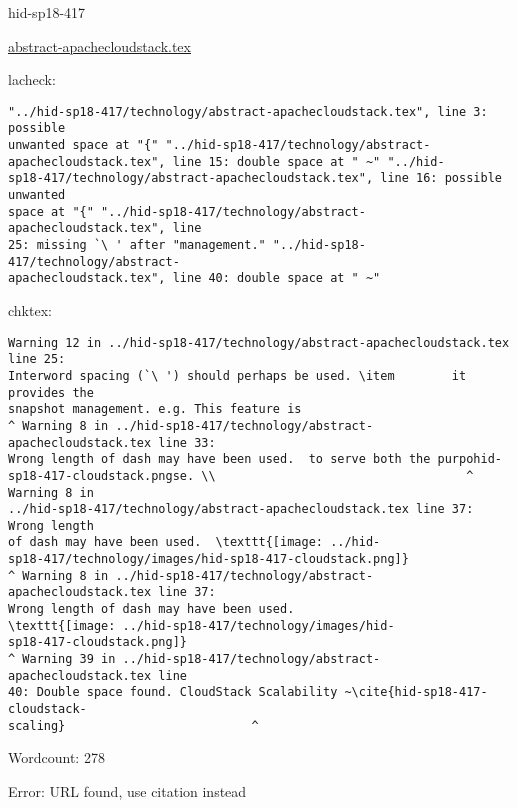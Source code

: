 

\begin{IU}

hid-sp18-417

\href{https://github.com/cloudmesh-community/hid-sp18-417/blob/master//technology/abstract-apachecloudstack.tex}{abstract-apachecloudstack.tex}

 
lacheck:
\begin{tiny}
\begin{verbatim}
"../hid-sp18-417/technology/abstract-apachecloudstack.tex", line 3: possible
unwanted space at "{" "../hid-sp18-417/technology/abstract-
apachecloudstack.tex", line 15: double space at " ~" "../hid-
sp18-417/technology/abstract-apachecloudstack.tex", line 16: possible unwanted
space at "{" "../hid-sp18-417/technology/abstract-apachecloudstack.tex", line
25: missing `\ ' after "management." "../hid-sp18-417/technology/abstract-
apachecloudstack.tex", line 40: double space at " ~"
\end{verbatim}
\end{tiny}
chktex:
\begin{tiny}
\begin{verbatim}
Warning 12 in ../hid-sp18-417/technology/abstract-apachecloudstack.tex line 25:
Interword spacing (`\ ') should perhaps be used. \item        it provides the
snapshot management. e.g. This feature is
^ Warning 8 in ../hid-sp18-417/technology/abstract-apachecloudstack.tex line 33:
Wrong length of dash may have been used.  to serve both the purpohid-
sp18-417-cloudstack.pngse. \\                                   ^ Warning 8 in
../hid-sp18-417/technology/abstract-apachecloudstack.tex line 37: Wrong length
of dash may have been used.  \texttt{[image: ../hid-
sp18-417/technology/images/hid-sp18-417-cloudstack.png]}
^ Warning 8 in ../hid-sp18-417/technology/abstract-apachecloudstack.tex line 37:
Wrong length of dash may have been used.
\texttt{[image: ../hid-sp18-417/technology/images/hid-
sp18-417-cloudstack.png]}
^ Warning 39 in ../hid-sp18-417/technology/abstract-apachecloudstack.tex line
40: Double space found. CloudStack Scalability ~\cite{hid-sp18-417-cloudstack-
scaling}                          ^
\end{verbatim}
\end{tiny}

Wordcount: 278

Error: URL found, use citation instead
\end{IU}

